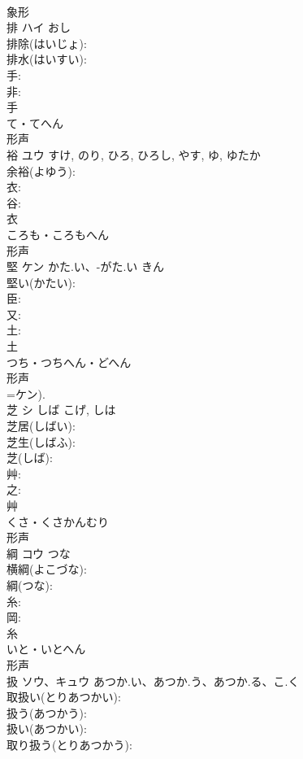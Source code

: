 \documentclass[8pt]{extreport}
\begin{document}
\begin{CJK}{UTF8}{min}
\\	象形 
\\	排	ハイ		おし	
\\	排除(はいじょ): 
\\	排水(はいすい): 
\\	手: 
\\	非: 
\\	手	
\\	て・てへん	
\\	形声 
\\	裕	ユウ		すけ, のり, ひろ, ひろし, やす, ゆ, ゆたか	
\\	余裕(よゆう): 
\\	衣: 
\\	谷: 
\\	衣	
\\	ころも・ころもへん	
\\	形声 
\\	堅	ケン	かた.い、-がた.い	きん	
\\	堅い(かたい): 
\\	臣: 
\\	又: 
\\	土: 
\\	土	
\\	つち・つちへん・どへん	
\\	形声 
\\	=ケン).
\\	芝	シ	しば	こげ, しは	
\\	芝居(しばい): 
\\	芝生(しばふ): 
\\	芝(しば): 
\\	艸: 
\\	之: 
\\	艸	
\\	くさ・くさかんむり	
\\	形声 
\\	綱	コウ	つな		
\\	横綱(よこづな): 
\\	綱(つな): 
\\	糸: 
\\	岡: 
\\	糸	
\\	いと・いとへん	
\\	形声 
\\	扱	ソウ、キュウ	あつか.い、あつか.う、あつか.る、こ.く		
\\	取扱い(とりあつかい): 
\\	扱う(あつかう): 
\\	扱い(あつかい): 
\\	取り扱う(とりあつかう): 

\end{CJK}
\end{document}
